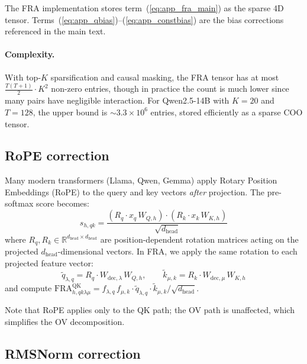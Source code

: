 \documentclass{article}
\theoremstyle{plain}
\theoremstyle{definition}
\theoremstyle{remark}
\newcommand{\dhead}{d_{\mathrm{head}}}
\newcommand{\RR}{\mathbb{R}}
\begin{document}
The FRA implementation stores term~(\ref{eq:app_fra_main}) as the sparse 4D tensor. Terms~(\ref{eq:app_qbias})--(\ref{eq:app_constbias}) are the bias corrections referenced in the main text.

\paragraph{Complexity.} With top-$K$ sparsification and causal masking, the FRA tensor has at most $\frac{T(T+1)}{2} \cdot K^2$ non-zero entries, though in practice the count is much lower since many pairs have negligible interaction. For Qwen2.5-14B with $K{=}20$ and $T{=}128$, the upper bound is ${\sim}3.3 \times 10^6$ entries, stored efficiently as a sparse COO tensor.

\subsection{RoPE correction}
\label{app:rope}

Many modern transformers (Llama, Qwen, Gemma) apply Rotary Position Embeddings (RoPE) to the query and key vectors \emph{after} projection. The pre-softmax score becomes:
\begin{equation}
    s_{h,qk} = \frac{\left(R_q \cdot x_q\,W_{Q,h} \right) \cdot \left( R_k \cdot x_k\,W_{K,h} \right)}{\sqrt{\dhead}}
\end{equation}
where $R_q, R_k \in \RR^{\dhead \times \dhead}$ are position-dependent rotation matrices acting on the projected $\dhead$-dimensional vectors. In FRA, we apply the same rotation to each projected feature vector:
\begin{equation}
    \tilde{q}_{\lambda,q} = R_q \cdot W_{\mathrm{dec},\lambda}\,W_{Q,h}, \qquad \tilde{k}_{\mu,k} = R_k \cdot W_{\mathrm{dec},\mu}\,W_{K,h}
\end{equation}
and compute $\mathrm{FRA}^{\mathrm{QK}}_{h,qk\lambda\mu} = f_{\lambda,q} \, f_{\mu,k} \cdot \tilde{q}_{\lambda,q} \cdot \tilde{k}_{\mu,k} / \sqrt{\dhead}$.

Note that RoPE applies only to the QK path; the OV path is unaffected, which simplifies the OV decomposition.

\subsection{RMSNorm correction}
\label{app:rms}
\end{document}
